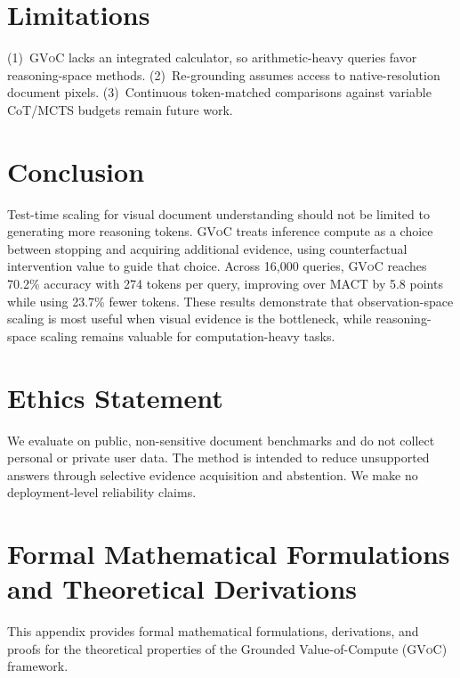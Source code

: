 \documentclass[11pt]{article}
\begin{document}
\section{Limitations}
\label{sec:limitations}

(1)~\textsc{GVoC} lacks an integrated calculator, so arithmetic-heavy queries favor reasoning-space methods. (2)~Re-grounding assumes access to native-resolution document pixels. (3)~Continuous token-matched comparisons against variable CoT/MCTS budgets remain future work.

\section{Conclusion}
\label{sec:conclusion}

Test-time scaling for visual document understanding should not be limited to generating more reasoning tokens. \textsc{GVoC} treats inference compute as a choice between stopping and acquiring additional evidence, using counterfactual intervention value to guide that choice. Across 16,000 queries, \textsc{GVoC} reaches 70.2\% accuracy with 274 tokens per query, improving over MACT by 5.8 points while using 23.7\% fewer tokens. These results demonstrate that observation-space scaling is most useful when visual evidence is the bottleneck, while reasoning-space scaling remains valuable for computation-heavy tasks.

\section{Ethics Statement}
\label{sec:ethics}

We evaluate on public, non-sensitive document benchmarks and do not collect personal or private user data. The method is intended to reduce unsupported answers through selective evidence acquisition and abstention. We make no deployment-level reliability claims.

\clearpage



\clearpage
\appendix

\section{Formal Mathematical Formulations and Theoretical Derivations}
\label{app:proofs}

This appendix provides formal mathematical formulations, derivations, and proofs for the theoretical properties of the Grounded Value-of-Compute (\textsc{GVoC}) framework.
\end{document}
